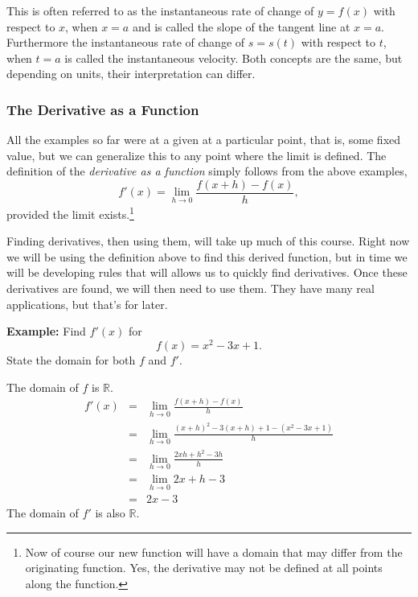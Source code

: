 \documentclass[12pt,addpoints, answers, fleqn]{exam}
\begin{document}
This is often referred to as the instantaneous rate of change of $y =  f \left( x \right)$ with respect to $x$, when $x=a$ and is called the slope of the tangent line at $x=a$. Furthermore  the instantaneous rate of change of $s =  s \left( t \right)$ with respect to $t$, when $t=a$ is called the instantaneous velocity. Both concepts are the same, but depending on units, their interpretation can differ.


\subsubsection{The Derivative as a Function}


All the examples so far were at a given at a particular point, that is, some fixed value, but we can generalize this to any point where the limit is defined. The definition of the \emph{derivative as a function} simply follows from the above examples,
\[
f' \left( x \right) = \lim_{h \to 0 }  \frac{f \left( x+h \right) - f \left( x \right)}{h},
\]
provided the limit exists.\footnote{Now of course our new function will have a domain that may differ from the originating function. Yes, the derivative may not be defined at all points along the function.}


Finding derivatives, then using them, will take up much of this course. Right now we will be using the definition above to find this derived function, but in time we will be developing rules that will allows us to quickly find derivatives. Once these derivatives are found, we will then need to use them. They have many real applications, but that's for later.

 
\textbf{Example:} Find $f'\left(x\right)$ for
\[
f \left( x \right) = x^2 -3x +1.
\]
State the domain for both $f$ and $f'$.



\begin{solution}
The domain of $f$ is $\mathbb{R}$.
\begin{eqnarray*}
f' \left( x \right) &=& \lim_{h \to 0 }  \frac{f \left( x+h \right) - f \left( x \right)}{h}\\
&=&  \lim_{h \to 0 }  \frac{ \left( x+h \right)^2 - 3\left( x+h \right) + 1 - \left( x^2 -3x +1 \right) }{h}\\
&=&  \lim_{h \to 0 }  \frac{2xh + h^2 -3h }{h}\\
&=&  \lim_{h \to 0 }  2x + h - 3\\
&=& 2x-3
\end{eqnarray*}
The domain of $f'$ is also $\mathbb{R}$.
\end{solution}
\end{document}
